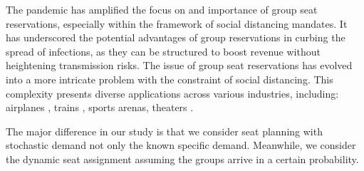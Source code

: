 The pandemic has amplified the focus on and importance of group seat reservations, especially within the framework of social distancing mandates. It has underscored the potential advantages of group reservations in curbing the spread of infections, as they can be structured to boost revenue without heightening transmission risks. The issue of group seat reservations has evolved into a more intricate problem with the constraint of social distancing. This complexity presents diverse applications across various industries, including: airplanes \cite{salari2022social}, trains \cite{salari2022social, haque2023social}, sports arenas\cite{kwag2022optimal}, theaters \cite{blom2022filling}.

The major difference in our study is that we consider seat planning with stochastic demand not only the known specific demand. Meanwhile, we consider the dynamic seat assignment assuming the groups arrive in a certain probability.





